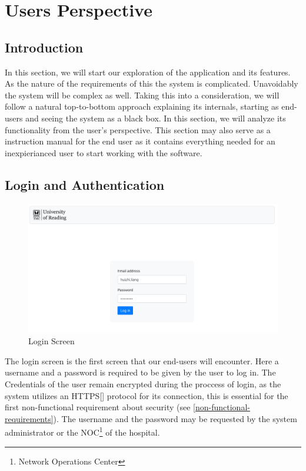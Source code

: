 \chapter{Users Perspective}
\label{users_perspective}
	\section{Introduction}
		In this section, we will start our exploration of the application and its features. As the nature of the requirements of this
		the system is complicated. Unavoidably the system will be complex as well. Taking this into a consideration, we will follow a natural top-to-bottom
		approach explaining its internals, starting as end-users and seeing the system as a black box. In this section, we will analyze its 
		functionality from the user's perspective. This section may also serve as a instruction manual for the end user as it contains everything needed
		for an inexpierianced user to start working with the software.
	\section{Login and Authentication}
		\begin{figure}[H]
			\iftrue
			\centering
			\caption{Login Screen}
			\includegraphics[scale=0.3]{figures/login}
			\fi
		\end{figure}
		The login screen is the first screen that our end-users will encounter. Here a username and a password is required to be given by the 
		user to log in. The Credentials of the user remain encrypted during the proccess of login, as the system utilizes an HTTPS[\cite{rfc2818}] 
		protocol for its connection, this is essential for the first non-functional requirement about security (see \ref{non-functional-requirements}).
		The username and the password may be requested by the system administrator or the NOC\footnote{Network Operations Center} of the hospital.
